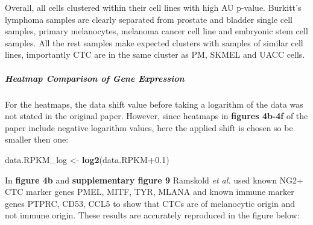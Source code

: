 \documentclass[]{article}
\newenvironment{Shaded}{\begin{snugshade}}{\end{snugshade}}
\newcommand{\KeywordTok}[1]{\textcolor[rgb]{0.13,0.29,0.53}{\textbf{#1}}}
\newcommand{\FloatTok}[1]{\textcolor[rgb]{0.00,0.00,0.81}{#1}}
\newcommand{\StringTok}[1]{\textcolor[rgb]{0.31,0.60,0.02}{#1}}
\newcommand{\OperatorTok}[1]{\textcolor[rgb]{0.81,0.36,0.00}{\textbf{#1}}}
\newcommand{\NormalTok}[1]{#1}
\let\oldsubparagraph\subparagraph
\renewcommand{\subparagraph}[1]{\oldsubparagraph{#1}\mbox{}}
\begin{document}
Overall, all cells clustered within their cell lines with high AU
p-value. Burkitt's lymphoma samples are clearly separated from prostate
and bladder single cell samples, primary melanocytes, melanoma cancer
cell line and embryonic stem cell samples. All the rest samples make
expected clusters with samples of similar cell lines, importantly CTC
are in the same cluster as PM, SKMEL and UACC cells.

\subparagraph{Heatmap Comparison of Gene
Expression}\label{heatmap-comparison-of-gene-expression}

For the heatmaps, the data shift value before taking a logarithm of the
data was not stated in the original paper. However, since heatmaps in
\textbf{figures 4b-4f} of the paper include negative logarithm values,
here the applied shift is chosen so be smaller then one:

\begin{Shaded}
\begin{Highlighting}[]
\NormalTok{data.RPKM_log <-}\StringTok{ }\KeywordTok{log2}\NormalTok{(data.RPKM}\OperatorTok{+}\FloatTok{0.1}\NormalTok{)}
\end{Highlighting}
\end{Shaded}

In \textbf{figure 4b} and \textbf{supplementary figure 9} Ramskold
\emph{et al.} used known NG2+ CTC marker genes PMEL, MITF, TYR, MLANA
and known immune marker genes PTPRC, CD53, CCL5 to show that CTCs are of
melanocytic origin and not immune origin. These results are accurately
reproduced in the figure below:
\end{document}
